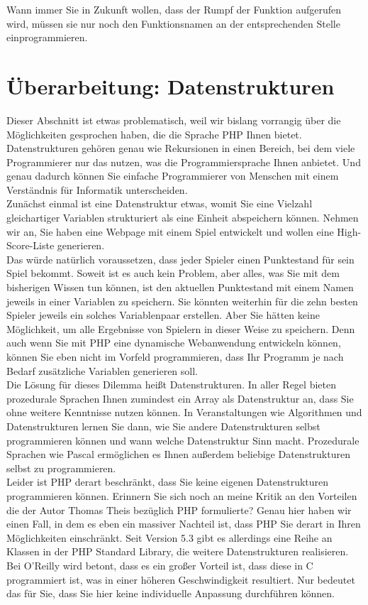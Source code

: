 Wann immer Sie in Zukunft wollen, dass der Rumpf der Funktion aufgerufen wird, müssen sie nur noch den Funktionsnamen an der entsprechenden Stelle einprogrammieren.

\section{Überarbeitung: Datenstrukturen}

Dieser Abschnitt ist etwas problematisch, weil wir bislang vorrangig über die Möglichkeiten gesprochen haben, die die Sprache PHP Ihnen bietet. Datenstrukturen gehören genau wie Rekursionen in einen Bereich, bei dem viele Programmierer nur das nutzen, was die Programmiersprache Ihnen anbietet. Und genau dadurch können Sie einfache Programmierer von Menschen mit einem Verständnis für Informatik unterscheiden.\\

Zunächst einmal ist eine Datenstruktur etwas, womit Sie eine Vielzahl gleichartiger Variablen strukturiert als eine Einheit abspeichern können. Nehmen wir an, Sie haben eine Webpage mit einem Spiel entwickelt und wollen eine High-Score-Liste generieren.\\

Das würde natürlich voraussetzen, dass jeder Spieler einen Punktestand für sein Spiel bekommt. Soweit ist es auch kein Problem, aber alles, was Sie mit dem bisherigen Wissen tun können, ist den aktuellen Punktestand mit einem Namen jeweils in einer Variablen zu speichern. Sie könnten weiterhin für die zehn besten Spieler jeweils ein solches Variablenpaar erstellen. Aber Sie hätten keine Möglichkeit, um alle Ergebnisse von Spielern in dieser Weise zu speichern. Denn auch wenn Sie mit PHP eine dynamische Webanwendung entwickeln können, können Sie eben nicht im Vorfeld programmieren, dass Ihr Programm je nach Bedarf zusätzliche Variablen generieren soll.\\

Die Lösung für dieses Dilemma heißt Datenstrukturen. In aller Regel bieten prozedurale Sprachen Ihnen zumindest ein Array als Datenstruktur an, dass Sie ohne weitere Kenntnisse nutzen können. In Veranstaltungen wie Algorithmen und Datenstrukturen lernen Sie dann, wie Sie andere Datenstrukturen selbst programmieren können und wann welche Datenstruktur Sinn macht. Prozedurale Sprachen wie Pascal ermöglichen es Ihnen außerdem beliebige Datenstrukturen selbst zu programmieren.\\

Leider ist PHP derart beschränkt, dass Sie keine eigenen Datenstrukturen programmieren können. Erinnern Sie sich noch an meine Kritik an den \glqq{}Vorteilen\grqq{} die der Autor Thomas Theis bezüglich PHP formulierte? Genau hier haben wir einen Fall, in dem es eben ein massiver Nachteil ist, dass PHP Sie derart in Ihren Möglichkeiten einschränkt. Seit Version 5.3 gibt es allerdings eine Reihe an Klassen in der PHP Standard Library, die weitere Datenstrukturen realisieren. Bei O’Reilly wird betont, dass es ein großer Vorteil ist, dass diese in C programmiert ist, was in einer höheren Geschwindigkeit resultiert. Nur bedeutet das für Sie, dass Sie hier keine individuelle Anpassung durchführen können.\\

